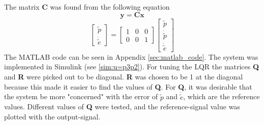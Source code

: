 The matrix \textbf{C} was found from the following equation
\begin{equation}\label{eq:output}
    \boldsymbol{y = Cx}
\end{equation}
\[
    \begin{bmatrix}
    \tilde{p}\\
    \dot{\tilde{e}}
    \end{bmatrix}
=
    \begin{bmatrix}
    1 & 0 & 0 \\
    0 & 0 & 1
    \end{bmatrix}
    \begin{bmatrix}
    \tilde{p}\\
    \dot{\tilde{p}}\\
    \dot{\tilde{e}}
    \end{bmatrix}
\]
The MATLAB code can be seen in Appendix \ref{sec:matlab_code}.
The system was implemented in Simulink (see \cref{sim:u=p3p2}). For tuning the LQR the matrices \textbf{Q} and \textbf{R} were picked out to be diagonal. \textbf{R} was chosen to be 1 at the diagonal because this made it easier to find the values of \textbf{Q}. For \textbf{Q}, it was desirable that the system be more "concerned" with the error of $\tilde{p}$ and $\dot{\tilde{e}}$, which are the reference values. Different values of \textbf{Q} were tested, and the reference-signal value was plotted with the output-signal.
